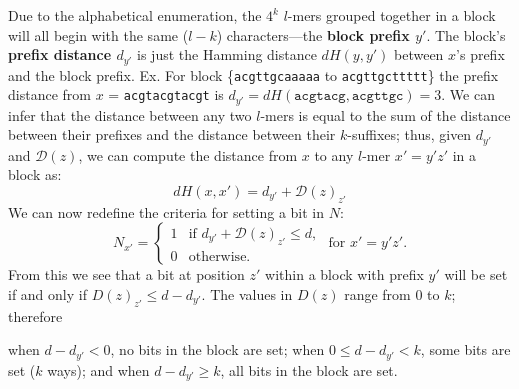 \documentclass{acm_proc_article-sp}
\begin{document}
\begin{enumerate}
			Due to the alphabetical enumeration, the $4^{k}$ $l$-mers grouped together in a block will all begin with the same ($l-k$) characters---the {\boldmath\bf block prefix $y'$}. The block's {\boldmath\bf prefix distance $d_{y'}$} is just the Hamming distance $dH(y,y')$ between $x$'s prefix and the block prefix.\newline\newline
				{\small
					Ex. For block \{\texttt{acgttgcaaaaa} to \texttt{acgttgcttttt}\}\newline
					\hspace*{18pt} the prefix distance from $x$ = \texttt{acgtacgtacgt} is\newline
					\hspace*{21pt} $d_{y'} = dH(\texttt{acgtacg}, \texttt{acgttgc}) = 3$. } \newline\newline
			We can infer that the distance between any two $l$-mers is equal to the sum of the distance between their prefixes and the distance between their $k$-suffixes; thus, given $d_{y'}$ and $\mathcal{D}(z)$, we can compute the distance from $x$ to any $l$-mer $x' = y'z'$ in a block as:
			\begin{equation}
				dH(x,x') = d_{y'} + \mathcal{D}(z)_{z'}
				\end{equation}
			We can now redefine the criteria for setting a bit in $N$:
			\begin{equation*}
				N_{x'} = \left\{
				\begin{array}{rl}
					1 & \text{if } d_{y'} + \mathcal{D}(z)_{z'} \leq d,\\
					0 & \text{otherwise.}%
				\end{array} \right.
				\text{ for }x' = y'z'.
				\end{equation*}
			From this we see that a bit at position $z'$ within a block with prefix $y'$ will be set if and only if $D(z)_{z'} \leq d-d_{y'}$. The values in $D(z)$ range from 0 to $k$; therefore\newline

				{\small
					\hspace*{5pt} when $d-d_{y'} < 0$, 		\hspace*{24pt}no bits in the block are set;\newline
					\hspace*{5pt} when $0 \leq d-d_{y'} < k$,	\hspace*{6.5pt}some bits are set ($k$ ways); and\newline
					\hspace*{5pt} when $d-d_{y'} \geq k$, 		\hspace*{24pt}all bits in the block are set. \newline}
			

\end{enumerate}
\end{document}
